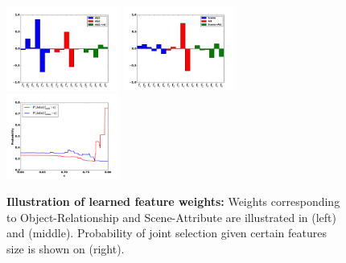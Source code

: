 \documentclass[runningheads]{llncs}
\newcommand{\RevComment} [1]{{\color{Red}{#1}}}
\begin{document}
\begin{figure}[t]
    \centering
    \includegraphics[width=3.7cm]{obj_rel_o1r_o2_coeffs.png}\hspace{0em}
    \includegraphics[width=3.7cm]{att_scene_coeffs.png}\hspace{0em}
    \includegraphics[width=3.7cm]{att_scene_prob_joint_given_med_mean.png}
    \caption{{\bf Illustration of learned feature weights:} Weights corresponding to Object-Relationship and Scene-Attribute are illustrated in (left) and (middle). Probability of joint selection given certain features size is shown on (right).}%
    \label{fig:learned_weights}
\end{figure}
\end{document}
